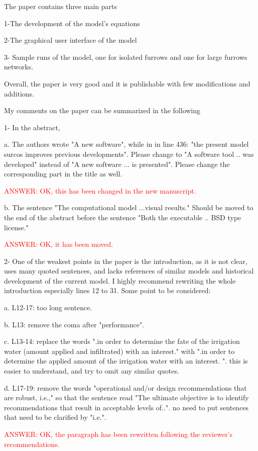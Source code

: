 \documentclass[a4paper]{article}
\begin{document}
The paper contains three main parts

1-The development of the model's equations

2-The graphical user interface of the model

3- Sample runs of the model, one for isolated furrows and one for large furrows networks.

Overall, the paper is very good and it is publishable with few modifications and additions.

My comments on the paper can be summarized in the following

1- In the abstract,

a. The authors wrote "A new software", while in in line 436: "the present model surcos improves previous developments". Please change to "A software tool .. was developed" instead of "A new software ... is presented". Please change the corresponding part in the title as well.

\textcolor{red}{ANSWER: OK, this has been changed in the new manuscript.}
 
b. The sentence "The computational model ...visual results." Should be moved to the end of the abstract before the sentence "Both the executable .. BSD type license."

\textcolor{red}{ANSWER: OK, it has been moved.}

2- One of the weakest points in the paper is the introduction, as it is not clear, uses many quoted sentences, and lacks references of similar models and historical development of the current model. I highly recommend rewriting the whole introduction especially lines 12 to 31. Some point to be considered:

a. L12-17: too long sentence.

b. L13: remove the coma after "performance".

c. L13-14: replace the words ".in order to determine the fate of the irrigation water (amount applied and infiltrated) with an interest." with ".in order to determine the applied amount of the irrigation water with an interest. ". this is easier to understand, and try to omit any similar quotes.

d. L17-19: remove the words "operational and/or design recommendations that are robust, i.e.," so that the sentence read "The ultimate objective is to identify recommendations that result in acceptable levels of..". no need to put sentences that need to be clarified by "i.e.".

\textcolor{red}{ANSWER: OK, the paragraph has been rewritten following the
reviewer's recommendations.}
\end{document}
